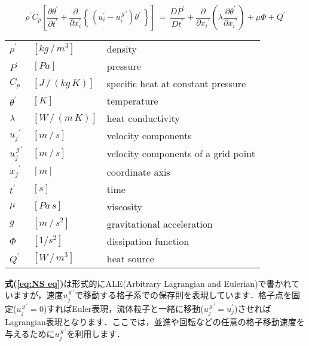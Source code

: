 \begin{equation}
\rho^\prime C_p \left[ \frac{\partial \theta^\prime}{\partial t^\prime} + \frac{\partial}{\partial x_i^\prime} \left\{ \, \left( u_i^\prime - u_i^{\,g\,\prime} \right) \theta^\prime \, \right\} \right] 
\,{=}\,
\frac{D{P}^{\prime}}{D{t}^{\prime}} + \frac{\partial}{\partial{{x}_{i}}^{\prime}} \left( {\lambda \frac{\partial{\theta}^{\prime}}{\partial{{x}_{i}}^{\prime}}} \right) + \mu\Phi + {Q}^{\prime}
\label{eq:energy eq}
\end{equation}

\vspace{1.0cm}
\begin{center}
\begin{tabular}{lll}
$\rho^{\prime}$ &  $[kg\,/\,m^3]$ & density \\
$P^{\prime}$ & $[Pa]$ & pressure \\
${C}_{p}$ & $[J\,/\,(kg\,K)]$ & specific heat at constant pressure \\
$\theta^{\prime}$ & $[K]$ & temperature \\
$\lambda$ & $[W\,/\,(m\,K)]$ & heat conductivity \\
${{u}_{j}}^{\prime}$ & $[m\,/\,s]$ & velocity components \\
$u_j^{\,g\,\prime}$ & $[m\,/\,s]$ & velocity components of a grid point \\
${{x}_{j}}^{\prime}$ & $[m]$ & coordinate axis\\
$t^{\prime}$ & $[s]$ & time\\
$\mu$ & $[Pa\,s]$ & viscosity\\
$g$ & $[m\,/\,s^2]$ & gravitational acceleration\\
$\Phi$ & $[1/s^{2}]$ & dissipation function\\
$Q^{\prime}$ & $[W\,/\,m^3]$ & heat source\\
\end{tabular}
\end{center}
\vspace{1.0cm}

\noindent \textbf{式(\ref{eq:NS eq})}は形式的にALE(Arbitrary Lagrangian and Eulerian)で書かれていますが，速度$u_j^{\,g\,\prime}$で移動する格子系での保存則を表現しています．格子点を固定($u_j^{\,g\,\prime}=0$)すればEuler表現，流体粒子と一緒に移動($u_j^{\,g\,\prime}=u_j^\prime$)させればLagrangian表現となります．ここでは，並進や回転などの任意の格子移動速度を与えるために$u_j^{\,g\,\prime}$を利用します．\\

